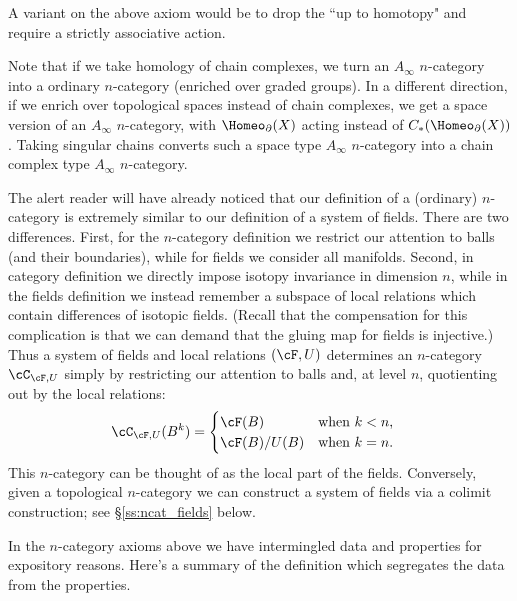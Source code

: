 A variant on the above axiom would be to drop the ``up to homotopy" and require a strictly associative action.

Note that if we take homology of chain complexes, we turn an $A_\infty$ $n$-category
into a ordinary $n$-category (enriched over graded groups).
In a different direction, if we enrich over topological spaces instead of chain complexes,
we get a space version of an $A_\infty$ $n$-category, with $\Homeo_\bd(X)$ acting 
instead of  $C_*(\Homeo_\bd(X))$.
Taking singular chains converts such a space type $A_\infty$ $n$-category into a chain complex
type $A_\infty$ $n$-category.

\medskip

The alert reader will have already noticed that our definition of a (ordinary) $n$-category
is extremely similar to our definition of a system of fields.
There are two differences.
First, for the $n$-category definition we restrict our attention to balls
(and their boundaries), while for fields we consider all manifolds.
Second,  in category definition we directly impose isotopy
invariance in dimension $n$, while in the fields definition we 
instead remember a subspace of local relations which contain differences of isotopic fields. 
(Recall that the compensation for this complication is that we can demand that the gluing map for fields is injective.)
Thus a system of fields and local relations $(\cF,U)$ determines an $n$-category $\cC_ {\cF,U}$ simply by restricting our attention to
balls and, at level $n$, quotienting out by the local relations:
\begin{align*}
\cC_{\cF,U}(B^k) & = \begin{cases}\cF(B) & \text{when $k<n$,} \\ \cF(B) / U(B) & \text{when $k=n$.}\end{cases}
\end{align*}
This $n$-category can be thought of as the local part of the fields.
Conversely, given a topological $n$-category we can construct a system of fields via 
a colimit construction; see \S \ref{ss:ncat_fields} below.

In the $n$-category axioms above we have intermingled data and properties for expository reasons.
Here's a summary of the definition which segregates the data from the properties.

